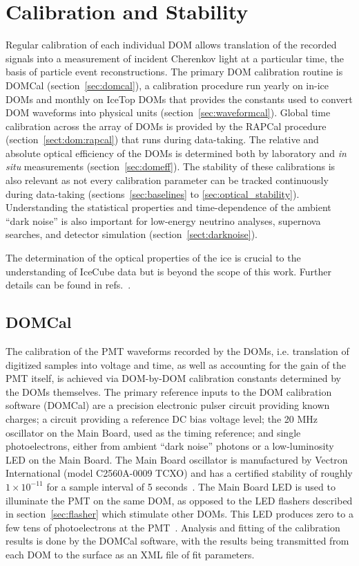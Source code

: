 \section{\label{sec:dom_calibration}Calibration and Stability}

Regular calibration of each individual DOM allows translation of the
recorded signals into a measurement of incident Cherenkov light at a
particular time, the basis of particle event reconstructions.  The
primary DOM calibration routine is DOMCal (section~\ref{sec:domcal}), a
calibration procedure run yearly on in-ice DOMs and monthly on IceTop
DOMs that provides the constants used to convert DOM waveforms into
physical units (section~\ref{sec:waveformcal}).  Global time calibration across the array of DOMs is 
provided by the RAPCal procedure (section~\ref{sect:dom:rapcal}) that runs during
data-taking.  The relative and absolute optical efficiency of the DOMs is
determined both by laboratory and \emph{in situ} measurements
(section~\ref{sec:domeff}). The stability of these calibrations is also relevant
as not every calibration parameter can be tracked continuously during
data-taking (sections~\ref{sec:baselines} to \ref{sec:optical_stability}).
Understanding the statistical properties and time-dependence of the ambient ``dark
noise'' is also important for low-energy neutrino analyses, supernova
searches, and detector simulation (section~\ref{sect:darknoise}).

The determination of the optical properties of the ice is crucial to
the understanding of IceCube data but is beyond the scope of this work.
Further details can be found in refs.~\cite{Aartsen:2013rt,IC3:spice_lea}.

\subsection{\label{sec:domcal}DOMCal}

The calibration of the PMT waveforms recorded by the DOMs, i.e. translation
of digitized samples into voltage and time, as well as accounting for the
gain of the PMT itself, is achieved via DOM-by-DOM calibration constants
determined by the DOMs themselves. The primary reference inputs to
the DOM calibration software (DOMCal) are a precision electronic
pulser circuit providing known charges; a circuit providing a reference DC
bias voltage level; the 20 MHz oscillator on the Main
Board, used as the timing reference; and single photoelectrons, either from
ambient ``dark noise'' photons or a low-luminosity LED on the Main
Board.  The Main Board oscillator is manufactured by Vectron
International (model C2560A-0009 TCXO) and has a certified stability
of roughly $1 \times 10^{-11}$ for a sample interval of 5 seconds~\cite{ICECUBE:DAQ}.
The Main Board LED is used to illuminate the PMT on the same DOM, as opposed
to the LED flashers described in 
section~\ref{sec:flasher} which stimulate other DOMs. This LED produces
zero to a few tens of photoelectrons at the PMT~\cite{ICECUBE:DAQ}. Analysis and fitting of the
calibration results is done by the DOMCal software, with the results being
transmitted from each DOM to the surface as an XML file of fit parameters.

